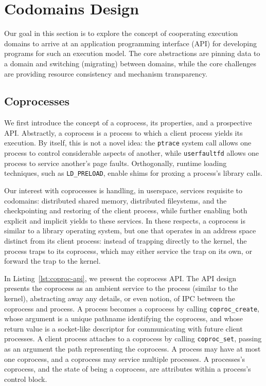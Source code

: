 \section{Codomains Design}
\label{sec:codomains-design}

Our goal in this section is to explore the concept of cooperating execution
domains to arrive at an application programming interface (API)
for developing programs for such an execution model.
%
The core abstractions are pinning data to a domain and switching (migrating)
between domains, while the core challenges are providing resource
consistency and mechanism transparency.


\subsection{Coprocesses}

We first introduce the concept of a coprocess, its properties, and a
prospective API\@.
%
Abstractly, a coprocess is a process to which a client process yields its
execution.
%
By itself, this is not a novel idea: the \texttt{ptrace} system call allows one
process to control considerable aspects of another, while
\texttt{userfaultfd} allows one process to service another's page faults.
%
Orthogonally, runtime loading techniques, such as \texttt{LD\_PRELOAD}, enable
shims for proxing a process's library calls.


Our interest with coprocesses is handling, in userspace, services requisite to
codomains: distributed shared memory, distributed fileystems, and the
checkpointing and restoring of the client process, while further enabling both
explicit and implicit yields to these services.
%
In these respects, a coprocess is similar to a library operating system, but
one that operates in an address space distinct from its client process: instead of
trapping directly to the kernel, the process traps to its coprocess, which may
either service the trap on its own, or forward the trap to the kernel.


%
In Listing~\ref{lst:coproc-api}, we present the coprocess API\@.
%
The API design presents the coprocess as an ambient service to the process
(similar to the kernel), abstracting away any details, or even notion, of IPC
between the coprocess and process.
%
A process becomes a coprocess by calling \texttt{coproc\_create}, whose
argument is a unique pathname identifying the coprocess, and whose return value
is a socket-like descriptor for communicating with future client processes.
%
A client process attaches to a coprocess by calling \texttt{coproc\_set}, passing as an
argument the path representing the coprocess.
%
A process may have at most one coprocess, and a coprocess may service multiple
processes.
%
A processes's coprocess, and the state of being a coprocess, are attributes
within a process's control block.


